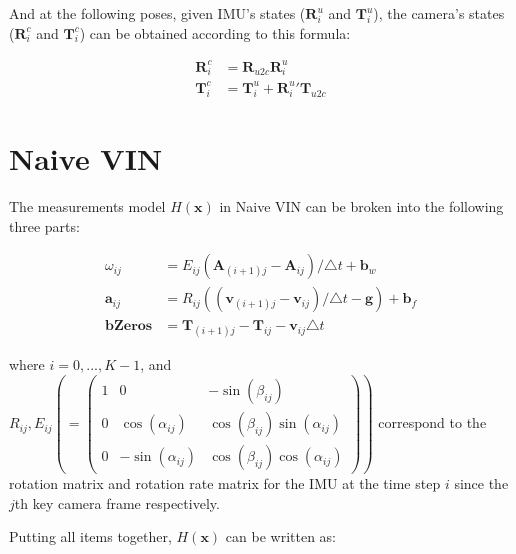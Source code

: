 \documentclass[12pt]{article}   %
\begin{document}
\begin{appendices}
And at the following poses, given IMU's states ($\textbf{R}^u_i$ and $\textbf{T}^u_i$), the camera's states ($\textbf{R}^c_i$ and $\textbf{T}^c_i$) can be obtained according to this formula:

\begin{align*}
\textbf{R}^c_i &= \textbf{R}_{u2c} \textbf{R}^u_i \\
\textbf{T}^c_i &= \textbf{T}^u_i + {\textbf{R}^u_i}'  \textbf{T}_{u2c}  
\end{align*} 
	

\section{Naive VIN}
The measurements model $H(\textbf{x})$ in Naive VIN can be broken into the following three parts:

\begin{align}
\omega_{ij} &= E_{ij} (\textbf{A}_{(i+1)j} - \textbf{A}_{ij})/\triangle t + \textbf{b}_w \\
\textbf{a}_{ij} &= R_{ij} ((\textbf{v}_{(i+1)j} - \textbf{v}_{ij}) / \triangle t - \textbf{g}) + \textbf{b}_f \\
\textbf{bZeros} &= \textbf{T}_{(i+1)j} - \textbf{T}_{ij} - \textbf{v}_{ij} \triangle t
\end{align}

where $i = 0,..., K-1$, and $R_{ij}, E_{ij} ( = \begin{pmatrix} 1 & 0 & -\sin(\beta_{ij}) \\ 0 & \cos(\alpha_{ij}) & \cos(\beta_{ij})\sin(\alpha_{ij}) \\ 0 & -\sin(\alpha_{ij}) & \cos(\beta_{ij})\cos(\alpha_{ij}) \end{pmatrix}) $ correspond to the rotation matrix and rotation rate matrix for the IMU at the time step $i$ since the $j$th key camera frame respectively.

Putting all items together, $H(\textbf{x})$ can be written as:


\end{appendices}
\end{document}
